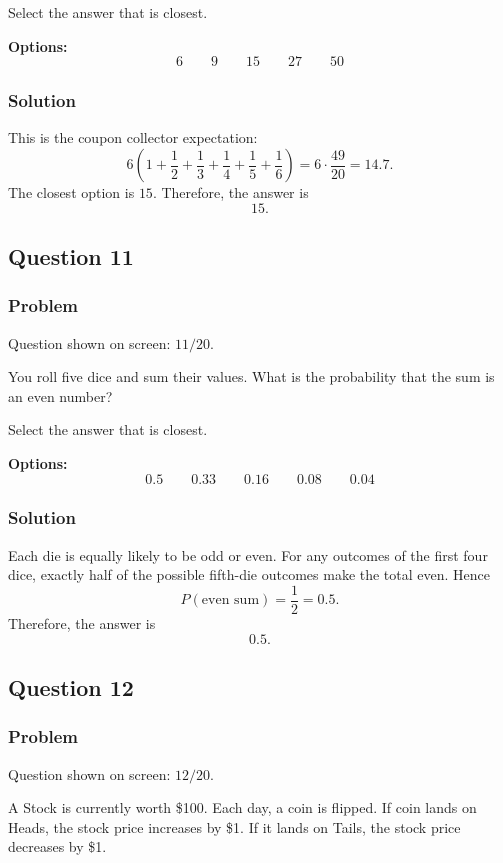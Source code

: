 \documentclass[12pt]{article}
\begin{document}
Select the answer that is closest.

\noindent\textbf{Options:}
\[
\boxed{6}
\qquad
\boxed{9}
\qquad
\boxed{15}
\qquad
\boxed{27}
\qquad
\boxed{50}
\]

\subsubsection{Solution}
This is the coupon collector expectation:
\[
6\left(1+\frac{1}{2}+\frac{1}{3}+\frac{1}{4}+\frac{1}{5}+\frac{1}{6}\right)
=6\cdot \frac{49}{20}=14.7.
\]
The closest option is \(15\). Therefore, the answer is
\[
\boxed{15}.
\]

\subsection{Question 11}
\subsubsection{Problem}
Question shown on screen: \(11/20\).

You roll five dice and sum their values. What is the probability that the sum is an even number?

Select the answer that is closest.

\noindent\textbf{Options:}
\[
\boxed{0.5}
\qquad
\boxed{0.33}
\qquad
\boxed{0.16}
\qquad
\boxed{0.08}
\qquad
\boxed{0.04}
\]

\subsubsection{Solution}
Each die is equally likely to be odd or even. For any outcomes of the first four dice, exactly half of the possible fifth-die outcomes make the total even. Hence
\[
P(\text{even sum})=\frac{1}{2}=0.5.
\]
Therefore, the answer is
\[
\boxed{0.5}.
\]

\subsection{Question 12}
\subsubsection{Problem}
Question shown on screen: \(12/20\).

A Stock is currently worth \$100. Each day, a coin is flipped. If coin lands on Heads, the stock price increases by \$1. If it lands on Tails, the stock price decreases by \$1.
\end{document}
